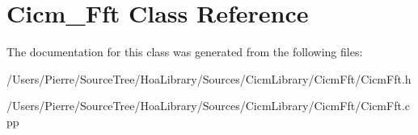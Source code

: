 \hypertarget{class_cicm___fft}{\section{Cicm\-\_\-\-Fft Class Reference}
\label{class_cicm___fft}
}


The documentation for this class was generated from the following files\-:\begin{DoxyCompactItemize}
\item 
/\-Users/\-Pierre/\-Source\-Tree/\-Hoa\-Library/\-Sources/\-Cicm\-Library/\-Cicm\-Fft/Cicm\-Fft.\-h\item 
/\-Users/\-Pierre/\-Source\-Tree/\-Hoa\-Library/\-Sources/\-Cicm\-Library/\-Cicm\-Fft/Cicm\-Fft.\-cpp\end{DoxyCompactItemize}
